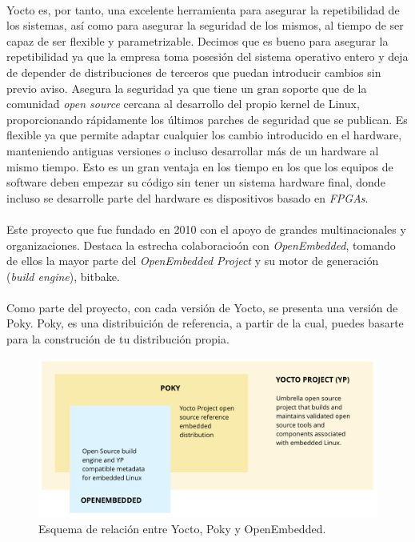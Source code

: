 \paragraph{} Yocto es, por tanto, una excelente herramienta para asegurar la repetibilidad
de los sistemas, así como para asegurar la seguridad de los mismos, al tiempo de ser capaz
de ser flexible y parametrizable. Decimos que es bueno para asegurar la repetibilidad
ya que la empresa toma posesión del sistema operativo entero y deja de depender de
distribuciones de terceros que puedan introducir cambios sin previo aviso. Asegura la
seguridad ya que tiene un gran soporte que de la comunidad \emph{\gls{open source}} cercana
al desarrollo del propio kernel de Linux, proporcionando rápidamente los últimos parches
de seguridad que se publican. Es flexible ya que permite adaptar cualquier los cambio
introducido en el hardware, manteniendo antiguas versiones o incluso desarrollar más de
un hardware al mismo tiempo. Esto es un gran ventaja en los tiempo en los que los equipos
de software deben empezar su código sin tener un sistema hardware final, donde incluso
se desarrolle parte del hardware es dispositivos basado en \emph{\gls{FPGAs}}.

\paragraph{} Este proyecto que fue fundado en 2010 con el apoyo de grandes multinacionales
y organizaciones. Destaca la estrecha colaboracioón con \emph{OpenEmbedded}, tomando de
ellos la mayor parte del \emph{OpenEmbedded Project} y su motor de generación (\emph{build
engine}), bitbake.

\paragraph{} Como parte del proyecto, con cada versión de Yocto, se presenta una versión
de Poky. Poky, es una distribuición de referencia, a partir de la cual, puedes basarte
para la construción de tu distribución propia.

\begin{figure}[h]
	\centering
	\includegraphics[width=0.60\linewidth]{figs/yocto-overview}
	\caption[Yocto Overview]{Esquema de relación entre Yocto, Poky y OpenEmbedded.}
	\label{fig:yocto_overview}
\end{figure}

